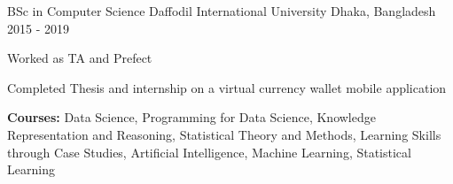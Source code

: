 
\begin{cventries}

  \cventry
    {BSc in Computer Science}
    {Daffodil International University}
    {Dhaka, Bangladesh}
    {2015 - 2019}
    {
      \begin{cvitems}
        \item {Worked as TA and Prefect}
        \item {Completed Thesis and internship on a virtual currency wallet mobile application}
        \item {\textbf{Courses:} Data Science, Programming for Data Science, Knowledge Representation and Reasoning, Statistical Theory and Methods, Learning Skills through Case Studies, Artificial Intelligence, Machine Learning, Statistical Learning}
      \end{cvitems}
    }

\end{cventries}
